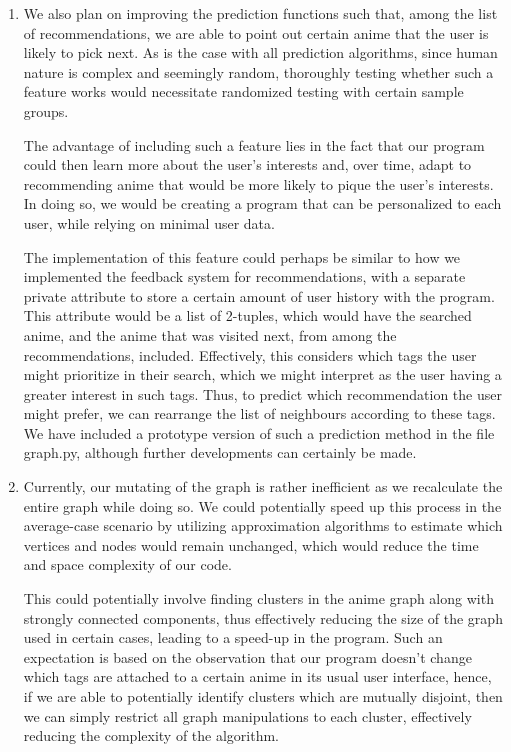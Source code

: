 \documentclass[12pt]{article}
\begin{document}
\begin{enumerate}
\begin{text}
\begin{enumerate}
    \item We also plan on improving the prediction functions such that, among the list of recommendations, we are able to point out certain anime that the user is likely to pick next. As is the case with all prediction algorithms, since human nature is complex and seemingly random, thoroughly testing whether such a feature works would necessitate randomized testing with certain sample groups.
    
    The advantage of including such a feature lies in the fact that our program could then learn more about the user's interests and, over time, adapt to recommending anime that would be more likely to pique the user's interests. In doing so, we would be creating a program that can be personalized to each user, while relying on minimal user data.
    
    The implementation of this feature could perhaps be similar to how we implemented the feedback system for recommendations, with a separate private attribute to store a certain amount of user history with the program. This attribute would be a list of 2-tuples, which would have the searched anime, and the anime that was visited next, from among the recommendations, included. Effectively, this considers which tags the user might prioritize in their search, which we might interpret as the user having a greater interest in such tags. Thus, to predict which recommendation the user might prefer, we can rearrange the list of neighbours according to these tags. We have included a prototype version of such a prediction method in the file graph.py, although further developments can certainly be made.
    
    \item Currently, our mutating of the graph is rather inefficient as we recalculate the entire graph while doing so. We could potentially speed up this process in the average-case scenario by utilizing approximation algorithms to estimate which vertices and nodes would remain unchanged, which would reduce the time and space complexity of our code.
    
    This could potentially involve finding clusters in the anime graph along with strongly connected components, thus effectively reducing the size of the graph used in certain cases, leading to a speed-up in the program. Such an expectation is based on the observation that our program doesn't change which tags are attached to a certain anime in its usual user interface, hence, if we are able to potentially identify clusters which are mutually disjoint, then we can simply restrict all graph manipulations to each cluster, effectively reducing the complexity of the algorithm.
\end{enumerate}


\end{text}
\end{enumerate}
\end{document}
